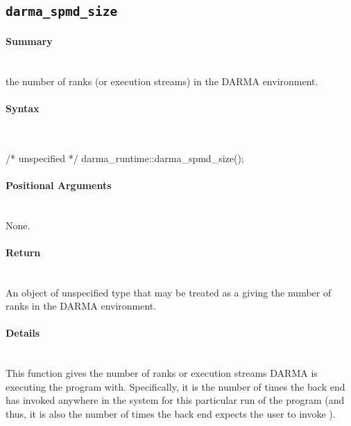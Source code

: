 \subsection{\texttt{darma\_spmd\_size}}


\paragraph{Summary}\mbox{}\\
 the number of \glspl{rank} (or \glspl{execution
stream}) in the \gls{DARMA} environment.

\paragraph{Syntax}\mbox{}\\
\begin{CppCode}
/* unspecified */ darma_runtime::darma_spmd_size();
\end{CppCode}

\paragraph{Positional Arguments} \mbox{}\\
None. 

\paragraph{Return} \mbox{}\\
An object of unspecified type that may be treated as a 
giving the number of \glspl{rank} in the \gls{DARMA} environment.

\paragraph{Details} \mbox{}\\
This function gives the number of \glspl{rank} or \glspl{execution stream}
\gls{DARMA} is executing the program with. 
Specifically, it is the number of times the  back end has invoked
 anywhere in the system for this particular run of the
program (and thus, it is also the number of times the  back end expects the user
to invoke ).

